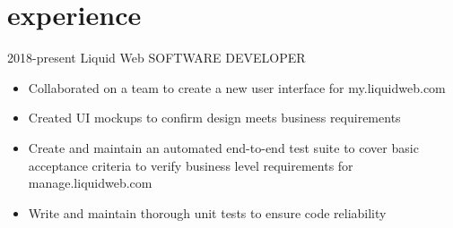 \documentclass[]{friggeri-cv}
\begin{document}
\section{experience}

\begin{entrylist}

\entry
  {2018-present}
  {\textcolor{gray}{\FA \faTint} Liquid Web}
  {SOFTWARE DEVELOPER}
  {
    \textit{}
    \begin{itemize}[topsep=2pt,leftmargin=0pt,itemsep=6pt]
      \item Collaborated on a team to create a new user interface for my.liquidweb.com
      \item Created UI mockups to confirm design meets business requirements
      \item Create and maintain an automated end-to-end test suite to cover basic acceptance criteria to verify business level requirements for manage.liquidweb.com
      \item Write and maintain thorough unit tests to ensure code reliability
    \end{itemize}
    
}
\end{entrylist}
\end{document}
